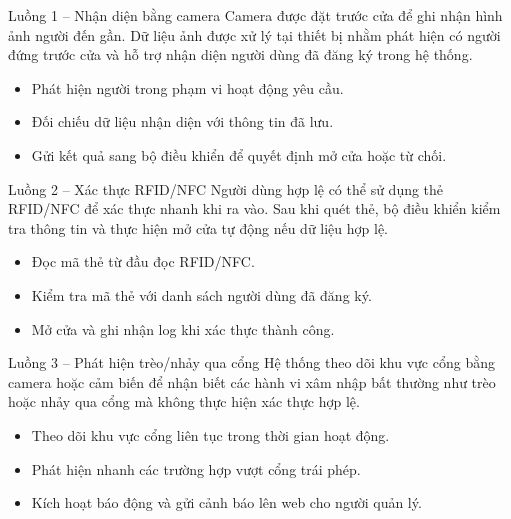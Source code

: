 \documentclass[aspectratio=169]{beamer}
\begin{document}
\begin{frame}{Luồng 1 -- Nhận diện bằng camera}
  Camera được đặt trước cửa để ghi nhận hình ảnh người đến gần. Dữ liệu ảnh được xử lý tại thiết bị nhằm phát hiện có người đứng trước cửa và hỗ trợ nhận diện người dùng đã đăng ký trong hệ thống.

  \vspace{0.8em}
  \begin{itemize}
    \item Phát hiện người trong phạm vi hoạt động yêu cầu.
    \item Đối chiếu dữ liệu nhận diện với thông tin đã lưu.
    \item Gửi kết quả sang bộ điều khiển để quyết định mở cửa hoặc từ chối.
  \end{itemize}
\end{frame}

\begin{frame}{Luồng 2 -- Xác thực RFID/NFC}
  Người dùng hợp lệ có thể sử dụng thẻ RFID/NFC để xác thực nhanh khi ra vào. Sau khi quét thẻ, bộ điều khiển kiểm tra thông tin và thực hiện mở cửa tự động nếu dữ liệu hợp lệ.

  \vspace{0.8em}
  \begin{itemize}
    \item Đọc mã thẻ từ đầu đọc RFID/NFC.
    \item Kiểm tra mã thẻ với danh sách người dùng đã đăng ký.
    \item Mở cửa và ghi nhận log khi xác thực thành công.
  \end{itemize}
\end{frame}

\begin{frame}{Luồng 3 -- Phát hiện trèo/nhảy qua cổng}
  Hệ thống theo dõi khu vực cổng bằng camera hoặc cảm biến để nhận biết các hành vi xâm nhập bất thường như trèo hoặc nhảy qua cổng mà không thực hiện xác thực hợp lệ.

  \vspace{0.8em}
  \begin{itemize}
    \item Theo dõi khu vực cổng liên tục trong thời gian hoạt động.
    \item Phát hiện nhanh các trường hợp vượt cổng trái phép.
    \item Kích hoạt báo động và gửi cảnh báo lên web cho người quản lý.
  \end{itemize}
\end{frame}
\end{document}
